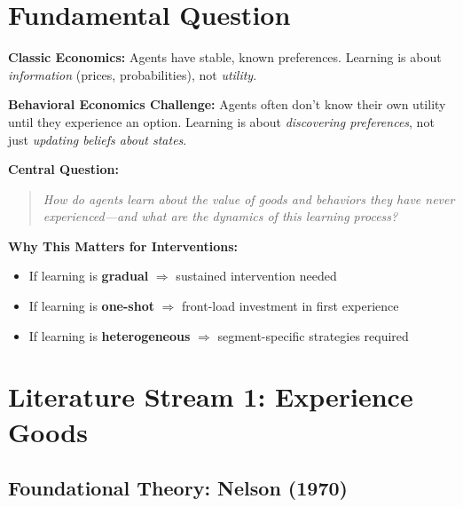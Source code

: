 \documentclass[11pt, a4paper]{article}
\begin{document}
\section{Fundamental Question}
\label{sec:lrn-question}

\begin{tcolorbox}[colback=orange!5!white, colframe=orange!75!black,
    title=The Learning Question in Behavioral Economics]

\textbf{Classic Economics:} Agents have stable, known preferences. Learning is about \textit{information} (prices, probabilities), not \textit{utility}.

\textbf{Behavioral Economics Challenge:} Agents often don't know their own utility until they experience an option. Learning is about \textit{discovering preferences}, not just \textit{updating beliefs about states}.

\textbf{Central Question:}
\begin{quote}
\textit{How do agents learn about the value of goods and behaviors they have never experienced---and what are the dynamics of this learning process?}
\end{quote}

\textbf{Why This Matters for Interventions:}
\begin{itemize}[nosep]
    \item If learning is \textbf{gradual} $\Rightarrow$ sustained intervention needed
    \item If learning is \textbf{one-shot} $\Rightarrow$ front-load investment in first experience
    \item If learning is \textbf{heterogeneous} $\Rightarrow$ segment-specific strategies required
\end{itemize}

\end{tcolorbox}


\section{Literature Stream 1: Experience Goods}
\label{sec:lrn-experience-goods}

\subsection{Foundational Theory: Nelson (1970)}
\end{document}
